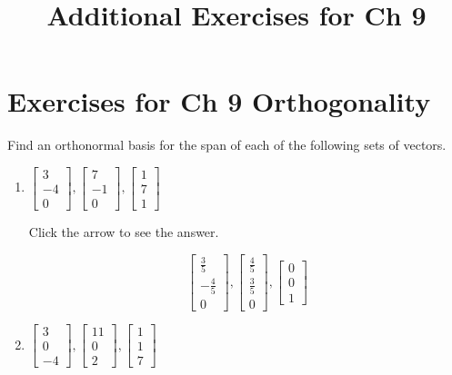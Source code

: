\documentclass{ximera}
\title{Additional Exercises for Ch 9} \license{CC BY-NC-SA 4.0}
\begin{document}
\begin{abstract}
\end{abstract}
\maketitle

\section*{Exercises for Ch 9 Orthogonality}

\begin{problem} Find an orthonormal basis for the span of each of the following sets of
vectors.

\begin{enumerate}
\item $\left[
\begin{array}{r}
 3 \\
-4 \\
0
\end{array}
\right] ,\left[
\begin{array}{r}
 7 \\
-1 \\
0
\end{array}
\right] ,\left[
\begin{array}{r}
 1 \\
7 \\
1
\end{array}
\right] $

Click the arrow to see the answer.
\begin{expandable}
\[
\left[
\begin{array}{c}
\frac{3}{5} \\
-\frac{4}{5} \\
0
\end{array}
\right] ,\left[
\begin{array}{c}
\frac{4}{5} \\
\frac{3}{5} \\
0
\end{array}
\right] ,\left[
\begin{array}{c}
0 \\
0 \\
1
\end{array}
\right]
\]
\end{expandable}

\item $\left[
\begin{array}{r}
3 \\
0 \\
-4
\end{array}
\right] ,\left[
\begin{array}{r}
 11 \\
0 \\
2
\end{array}
\right] ,\left[
\begin{array}{r}
1 \\
1 \\
7
\end{array}
\right] $


\end{enumerate}
\end{problem}
\end{document}
